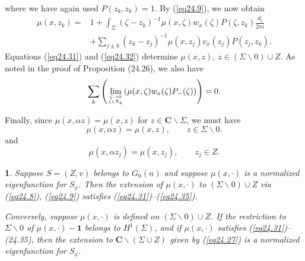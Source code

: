 \documentclass{surv-l}
\theoremstyle{plain}
\newtheorem{prop}[theorem]{\sc{Proposition}}
\theoremstyle{definition}
\numberwithin{equation}{chapter}
\begin{document}
where we have again used $P(z_{k}, z_{k})=1$. By (\ref{eq24.9}), we now obtain
\begin{align}\label{eq24.32}
\mu(x, z_{k})= & 1+\int_{\Sigma}(\zeta-z_{k})^{-1}\mu(x,\zeta)w_{x}(\zeta)P(\zeta,z_{k})\frac{d_{\zeta}}{2\pi i}\\
& +\sum_{j\pm k}(z_{k}-z_{j})^{-1}\mu(x, z_{j})v_{x}(z_{j})P(z_{j}, z_{k}).\nonumber
\end{align}
Equations (\ref{eq24.31}) and (\ref{eq24.32}) determine $\mu(x, z),\ z\in(\Sigma\backslash 0)\cup Z$. As noted in the proof of Proposition (24.26), we also have
\begin{equation}\label{eq24.33}
\sum_{k}\left(\lim_{{\zeta\rightarrow 0}\atop{\zeta \in \Sigma_{k}}}(\mu(x, \zeta)w_{x}(\zeta)P_{-}(\zeta))\right)=0.
\end{equation}

Finally, since $\mu(x, \alpha z)=\mu(x,z)$ for $ z\in \textbf{C}\backslash \Sigma$, we must have
\setcounter{equation}{33}
\begin{equation}\label{eq24.34}
\mu(x, \alpha z)=\mu(x,z),\qquad z\in\Sigma\backslash 0.
\end{equation}
and
\begin{equation}\label{eq24.35}
\mu(x,\alpha z_{j})=\mu(x,z_{j}),\qquad z_{j}\in Z.
\end{equation}
\setcounter{theorem}{35}
\begin{prop}\label{prop24.36}
Suppose $S= (Z, v)$ belongs to $G_{0}(n)$ and suppose $\mu(x, \cdot)$
is a normalized eigenfunction for $S_{x}$. Then the extension of
$\mu(x, \cdot)$ to $(\Sigma\backslash 0)\cup Z$ via \emph{(\ref{eq24.8})},
\emph{(\ref{eq24.9})} satisfies \emph{(\ref{eq24.31})--(\ref{eq24.35})}.

Conversely, suppose $\mu(x, \cdot)$ is defined on $(\Sigma\backslash
0)\cup Z$. If the restriction to $\Sigma\backslash 0$ of $\mu(x,
\cdot)-\mathbf{1}$ belongs to $H^{1}(\Sigma)$, and if $\mu(x, \cdot)$
satisfies \emph{(\ref{eq24.31})--(24.35)}, then the extension to
$\mathbf{C}\backslash (\Sigma\cup Z)$ given by \emph{(\ref{eq24.27})} is a normalized eigenfunction for $S_{x}$.
\end{prop}
\end{document}
